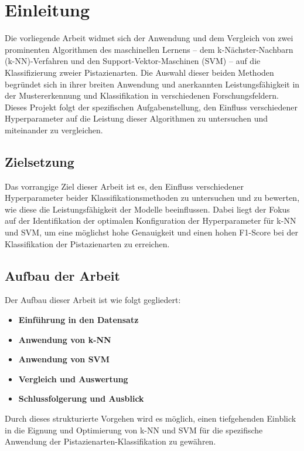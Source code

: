 
\section{Einleitung}
Die vorliegende Arbeit widmet sich der Anwendung und dem Vergleich von zwei prominenten Algorithmen des maschinellen Lernens – dem k-Nächster-Nachbarn (k-NN)-Verfahren und den Support-Vektor-Maschinen (SVM) – auf die Klassifizierung zweier Pistazienarten.
Die Auswahl dieser beiden Methoden begründet sich in ihrer breiten Anwendung und anerkannten Leistungsfähigkeit in der Mustererkennung und Klassifikation in verschiedenen Forschungsfeldern.
Dieses Projekt folgt der spezifischen Aufgabenstellung, den Einfluss verschiedener Hyperparameter auf die Leistung dieser Algorithmen zu untersuchen und miteinander zu vergleichen.
\subsection*{Zielsetzung}
Das vorrangige Ziel dieser Arbeit ist es, den Einfluss verschiedener Hyperparameter beider Klassifikationsmethoden zu untersuchen und zu bewerten, wie diese die Leistungsfähigkeit der Modelle beeinflussen. Dabei liegt der Fokus auf der Identifikation der optimalen Konfiguration der Hyperparameter für k-NN und SVM, um eine möglichst hohe Genauigkeit und einen hohen F1-Score bei der Klassifikation der Pistazienarten zu erreichen.
\subsection*{Aufbau der Arbeit}
Der Aufbau dieser Arbeit ist wie folgt gegliedert:
\begin{itemize}[itemsep=0pt, parsep=0pt]
	\item \textbf{Einführung in den Datensatz}
	\item \textbf{Anwendung von k-NN}
	\item \textbf{Anwendung von SVM}
	\item \textbf{Vergleich und Auswertung}
	\item \textbf{Schlussfolgerung und Ausblick} 
\end{itemize}

Durch dieses strukturierte Vorgehen wird es möglich, einen tiefgehenden Einblick in die Eignung und Optimierung von k-NN und SVM für die spezifische Anwendung der Pistazienarten-Klassifikation zu gewähren.

